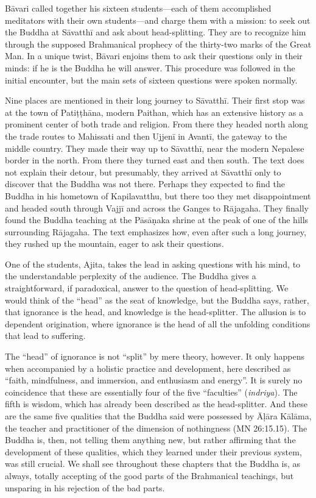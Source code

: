 \documentclass[12pt,openany]{book}%
\begin{document}
\textsanskrit{Bāvari} called together his sixteen students—each of them accomplished meditators with their own students—and charge them with a mission: to seek out the Buddha at \textsanskrit{Sāvatthī} and ask about head-splitting. They are to recognize him through the supposed Brahmanical prophecy of the thirty-two marks of the Great Man. In a unique twist, \textsanskrit{Bāvari} enjoins them to ask their questions only in their minds: if he is the Buddha he will answer. This procedure was followed in the initial encounter, but the main sets of sixteen questions were spoken normally.

Nine places are mentioned in their long journey to \textsanskrit{Sāvatthī}. Their first stop was at the town of \textsanskrit{Patiṭṭhāna}, modern Paithan, which has an extensive history as a prominent center of both trade and religion. From there they headed north along the trade routes to Mahissati and then \textsanskrit{Ujjenī} in \textsanskrit{Avantī}, the gateway to the middle country. They made their way up to \textsanskrit{Sāvatthī}, near the modern Nepalese border in the north. From there they turned east and then south. The text does not explain their detour, but presumably, they arrived at \textsanskrit{Sāvatthī} only to discover that the Buddha was not there. Perhaps they expected to find the Buddha in his hometown of Kapilavatthu, but there too they met disappointment and headed south through \textsanskrit{Vajjī} and across the Ganges to \textsanskrit{Rājagaha}. They finally found the Buddha teaching at the \textsanskrit{Pāsāṇaka} shrine at the peak of one of the hills surrounding \textsanskrit{Rājagaha}. The text emphasizes how, even after such a long journey, they rushed up the mountain, eager to ask their questions.

One of the students, Ajita, takes the lead in asking questions with his mind, to the understandable perplexity of the audience. The Buddha gives a straightforward, if paradoxical, answer to the question of head-splitting. We would think of the “head” as the seat of knowledge, but the Buddha says, rather, that ignorance is the head, and knowledge is the head-splitter. The allusion is to dependent origination, where ignorance is the head of all the unfolding conditions that lead to suffering.

The “head” of ignorance is not “split” by mere theory, however. It only happens when accompanied by a holistic practice and development, here described as “faith, mindfulness, and immersion, and enthusiasm and energy”. It is surely no coincidence that these are essentially four of the five “faculties” (\textit{indriya}). The fifth is wisdom, which has already been described as the head-splitter. And these are the same five qualities that the Buddha said were possessed by \textsanskrit{Āḷāra} \textsanskrit{Kālāma}, the teacher and practitioner of the dimension of nothingness (MN 26:15.15). The Buddha is, then, not telling them anything new, but rather affirming that the development of these qualities, which they learned under their previous system, was still crucial. We shall see throughout these chapters that the Buddha is, as always, totally accepting of the good parts of the Brahmanical teachings, but unsparing in his rejection of the bad parts.
\end{document}
